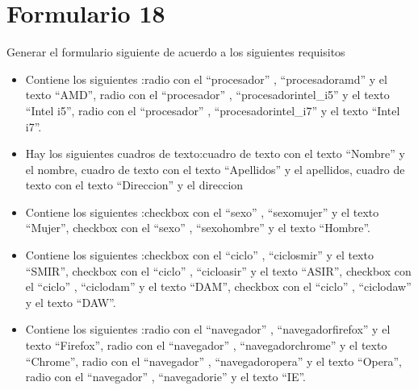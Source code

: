 \documentclass[letterpaper,10pt,spanish]{sphinxmanual}
\begin{document}
\section{Formulario 18}
\label{ejercicios/formularios/anexo_formularios:formulario-18}
Generar el formulario siguiente de acuerdo a los siguientes requisitos
\begin{itemize}
\item {} 
Contiene los siguientes :radio con el   ``procesador'' ,   ``procesadoramd''  y el texto ``AMD'', radio con el   ``procesador'' ,   ``procesadorintel\_i5''  y el texto ``Intel i5'', radio con el   ``procesador'' ,   ``procesadorintel\_i7''  y el texto ``Intel i7''.

\item {} 
Hay los siguientes cuadros de texto:cuadro de texto con el texto ``Nombre'' y el  nombre, cuadro de texto con el texto ``Apellidos'' y el  apellidos, cuadro de texto con el texto ``Direccion'' y el  direccion

\item {} 
Contiene los siguientes :checkbox con el   ``sexo'' ,   ``sexomujer''  y el texto ``Mujer'', checkbox con el   ``sexo'' ,   ``sexohombre''  y el texto ``Hombre''.

\item {} 
Contiene los siguientes :checkbox con el   ``ciclo'' ,   ``ciclosmir''  y el texto ``SMIR'', checkbox con el   ``ciclo'' ,   ``cicloasir''  y el texto ``ASIR'', checkbox con el   ``ciclo'' ,   ``ciclodam''  y el texto ``DAM'', checkbox con el   ``ciclo'' ,   ``ciclodaw''  y el texto ``DAW''.

\item {} 
Contiene los siguientes :radio con el   ``navegador'' ,   ``navegadorfirefox''  y el texto ``Firefox'', radio con el   ``navegador'' ,   ``navegadorchrome''  y el texto ``Chrome'', radio con el   ``navegador'' ,   ``navegadoropera''  y el texto ``Opera'', radio con el   ``navegador'' ,   ``navegadorie''  y el texto ``IE''.

\end{itemize}
\end{document}
